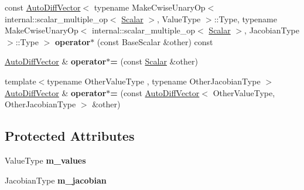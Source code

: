 \begin{DoxyCompactItemize}
const \hyperlink{class_eigen_1_1_auto_diff_vector}{Auto\+Diff\+Vector}$<$ typename Make\+Cwise\+Unary\+Op$<$ internal\+::scalar\+\_\+multiple\+\_\+op$<$ \hyperlink{class_eigen_1_1_auto_diff_scalar}{Scalar} $>$, Value\+Type $>$\+::Type, typename Make\+Cwise\+Unary\+Op$<$ internal\+::scalar\+\_\+multiple\+\_\+op$<$ \hyperlink{class_eigen_1_1_auto_diff_scalar}{Scalar} $>$, Jacobian\+Type $>$\+::Type $>$ {\bfseries operator$\ast$} (const Base\+Scalar \&other) const
\item 
\mbox{\label{class_eigen_1_1_auto_diff_vector_ab2de57504c49deaf117ae61d3ccce06e}} 
\hyperlink{class_eigen_1_1_auto_diff_vector}{Auto\+Diff\+Vector} \& {\bfseries operator$\ast$=} (const \hyperlink{class_eigen_1_1_auto_diff_scalar}{Scalar} \&other)
\item 
\mbox{\label{class_eigen_1_1_auto_diff_vector_abbe56ed8af87801f3315665668544660}} 
{\footnotesize template$<$typename Other\+Value\+Type , typename Other\+Jacobian\+Type $>$ }\\\hyperlink{class_eigen_1_1_auto_diff_vector}{Auto\+Diff\+Vector} \& {\bfseries operator$\ast$=} (const \hyperlink{class_eigen_1_1_auto_diff_vector}{Auto\+Diff\+Vector}$<$ Other\+Value\+Type, Other\+Jacobian\+Type $>$ \&other)
\end{DoxyCompactItemize}
\subsection*{Protected Attributes}
\begin{DoxyCompactItemize}
\item 
\mbox{\label{class_eigen_1_1_auto_diff_vector_a28c4ebee2675ca7537f67f4a1202f2a3}} 
Value\+Type {\bfseries m\+\_\+values}
\item 
\mbox{\label{class_eigen_1_1_auto_diff_vector_af0ea9a93266b29ce929aa019abb55904}} 
Jacobian\+Type {\bfseries m\+\_\+jacobian}
\end{DoxyCompactItemize}
